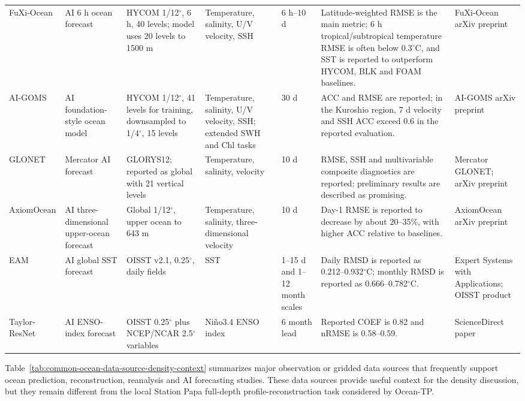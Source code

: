 \documentclass[10pt]{article}
\begin{document}
\begin{landscape}
\begin{longtable}{L{3.0cm}L{2.35cm}L{4.35cm}L{3.25cm}L{2.15cm}L{6.0cm}L{3.45cm}}
FuXi-Ocean & AI 6 h ocean forecast & HYCOM 1/12$^\circ$, 6 h, 40 levels; model uses 20 levels to 1500 m & Temperature, salinity, U/V velocity, SSH & 6 h--10 d & Latitude-weighted RMSE is the main metric; 6 h tropical/subtropical temperature RMSE is often below 0.3$^\circ$C, and SST is reported to outperform HYCOM, BLK and FOAM baselines. & FuXi-Ocean arXiv preprint \\
AI-GOMS & AI foundation-style ocean model & HYCOM 1/12$^\circ$, 41 levels for training, downsampled to 1/4$^\circ$, 15 levels & Temperature, salinity, U/V velocity, SSH; extended SWH and Chl tasks & 30 d & ACC and RMSE are reported; in the Kuroshio region, 7 d velocity and SSH ACC exceed 0.6 in the reported evaluation. & AI-GOMS arXiv preprint \\
GLONET & Mercator AI forecast & GLORYS12; reported as global with 21 vertical levels & Temperature, salinity, velocity & 10 d & RMSE, SSH and multivariable composite diagnostics are reported; preliminary results are described as promising. & Mercator GLONET; arXiv preprint \\
AxiomOcean & AI three-dimensional upper-ocean forecast & Global 1/12$^\circ$, upper ocean to 643 m & Temperature, salinity, three-dimensional velocity & 10 d & Day-1 RMSE is reported to decrease by about 20--35\%, with higher ACC relative to baselines. & AxiomOcean arXiv preprint \\
EAM & AI global SST forecast & OISST v2.1, 0.25$^\circ$, daily fields & SST & 1--15 d and 1--12 month scales & Daily RMSD is reported as 0.212--0.932$^\circ$C; monthly RMSD is reported as 0.666--0.782$^\circ$C. & Expert Systems with Applications; OISST product \\
Taylor-ResNet & AI ENSO-index forecast & OISST 0.25$^\circ$ plus NCEP/NCAR 2.5$^\circ$ variables & Ni\~{n}o3.4 ENSO index & 6 month lead & Reported COEF is 0.82 and nRMSE is 0.58--0.59. & ScienceDirect paper \\
\bottomrule
\end{longtable}
\endgroup
\end{landscape}

\noindent
Table~\ref{tab:common-ocean-data-source-density-context} summarizes major observation or gridded data sources that frequently support ocean prediction, reconstruction, reanalysis and AI forecasting studies.
These data sources provide useful context for the density discussion, but they remain different from the local Station Papa full-depth profile-reconstruction task considered by Ocean-TP.
\end{document}
